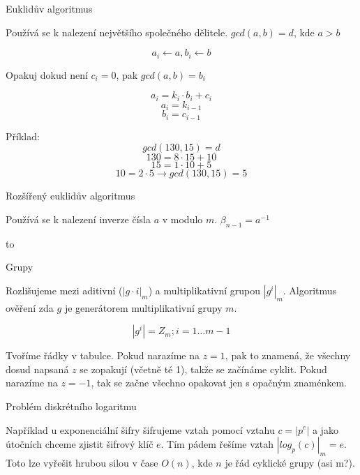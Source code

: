 \sec Euklidův algoritmus

Používá se k nalezení největšího společného dělitele. $gcd(a,b) = d$, kde $a > b$

$$a_i \leftarrow a, b_i \leftarrow b$$
\centerline{Opakuj dokud není $c_i = 0$, pak $gcd(a,b) = b_i$}
$$a_i = k_i \cdot b_i + c_i$$
$$a_i = k_{i-1}$$
$$b_i = c_{i-1}$$

\noindent
Příklad:
$$gcd(130,15) = d$$
$$130 = 8 \cdot 15 + 10$$
$$15 = 1 \cdot 10 + 5$$
$$10 = 2 \cdot 5 \rightarrow gcd(130,15) = 5$$

\sec Rozšířený euklidův algoritmus

Používá se k nalezení inverze čísla $a$ v modulo $m$. $\beta_{n-1} = a^{-1}$

\hbox to 

\sec Grupy

Rozlišujeme mezi aditivní ($\left|g\cdot i\right|_m$) a multiplikativní grupou $\left|g^i\right|_m$.
Algoritmus ověření zda $g$ je generátorem multiplikativní grupy $m$.

$$\left|g^i\right| = Z_m; i = 1 \ldots m - 1$$

Tvoříme řádky v tabulce. Pokud narazíme na $z = 1$, pak to znamená, že všechny dosud napsaná $z$ se zopakují (včetně té 1), takže se začínáme cyklit. Pokud narazíme na $z = -1$, tak se začne všechno opakovat jen s opačným znaménkem.

\medskip
{}

\sec Problém diskrétního logaritmu

Například u exponenciální šifry šifrujeme vztah pomocí vztahu $c=\left|p^e\right|$ a jako útočních chceme zjistit šifrový klíč $e$.
Tím pádem řešíme vztah $\left|log_{p}(c)\right|_m = e$. Toto lze vyřešit hrubou silou v čase $O(n)$, kde $n$ je řád cyklické grupy (asi m?).

